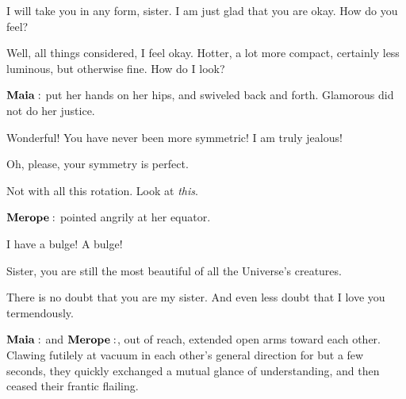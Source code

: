 \documentclass[main.tex]{subfiles}
\begin{document}
\Merope I will take you in any form, sister.  I am just glad that you are okay.  How do you feel?

\Maia Well, all things considered, I feel okay.  Hotter, a lot more compact, certainly less luminous, but otherwise fine.  How do I look?

$\Maia$ put her hands on her hips, and swiveled back and forth.  Glamorous did not do her justice.

\Merope Wonderful!  You have never been more symmetric!  I am truly jealous!

\Maia Oh, please, your symmetry is perfect.  

\Merope Not with all this rotation.  Look at \textit{this}.

$\Merope$ pointed angrily at her equator. 

\Merope I have a bulge!  A bulge!

\Maia Sister, you are still the most beautiful of all the Universe's creatures.

\Merope There is no doubt that you are my sister.  And even less doubt that I love you termendously.

$\Maia$ and $\Merope$, out of reach, extended open arms toward each other.  Clawing futilely at vacuum in each other's general direction for but a few seconds, they quickly exchanged a mutual glance of understanding, and then ceased their frantic flailing.
\end{document}
